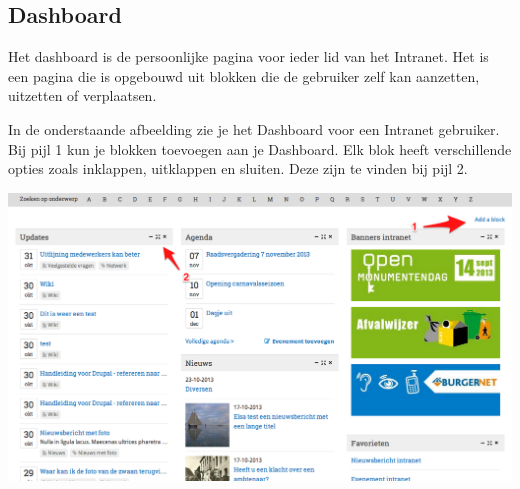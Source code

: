 \subsection{Dashboard}\label{dashboard}
Het dashboard is de persoonlijke pagina voor ieder lid van het Intranet. Het is een pagina die is opgebouwd uit blokken die de gebruiker zelf kan aanzetten, uitzetten of verplaatsen.

In de onderstaande afbeelding zie je het Dashboard voor een Intranet gebruiker. 
Bij pijl 1 kun je blokken toevoegen aan je Dashboard. Elk blok heeft verschillende opties zoals inklappen, uitklappen en sluiten. Deze zijn te vinden bij pijl 2.

\begin{center}
	\includegraphics[width=\textwidth]{img/dashboard.png}
\end{center}
